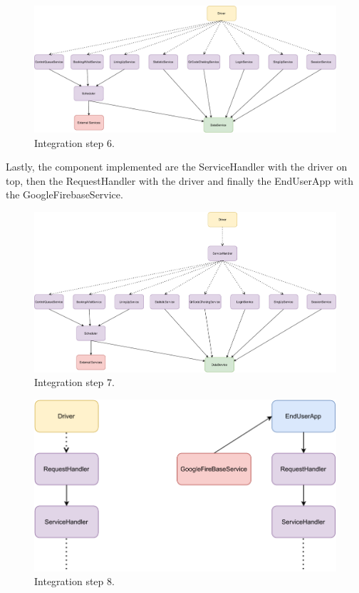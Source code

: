 \begin{figure}[H]
    \centering
    \includegraphics[width=1.0\textwidth]{images/component6.pdf}
    \caption{Integration step 6.}
\end{figure}

Lastly, the component implemented are the ServiceHandler with the driver on top, then the RequestHandler with the driver and finally the EndUserApp with the GoogleFirebaseService.

\begin{figure}[H]
    \centering
    \includegraphics[width=1.0\textwidth]{images/component7.pdf}
    \caption{Integration step 7.}
\end{figure}

\begin{figure}[H]
    \centering
    \includegraphics[width=1.0\textwidth]{images/component8.pdf}
    \caption{Integration step 8.}
\end{figure}
